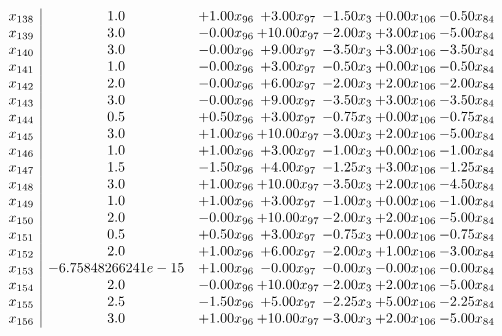\documentclass[8pt]{article}
\begin{document}
\[\begin{array}{c| c c@{\hskip 2pt} c@{\hskip 2pt} c@{\hskip 2pt} c@{\hskip 2pt} c@{\hskip 2pt} }
 x_{138}   &  1.0 & +  1.00 x_{96} & +  3.00 x_{97} & -1.50 x_{3} & +  0.00 x_{106} & -0.50 x_{84}\\
 x_{139}   &  3.0 & -0.00 x_{96} & + 10.00 x_{97} & -2.00 x_{3} & +  3.00 x_{106} & -5.00 x_{84}\\
 x_{140}   &  3.0 & -0.00 x_{96} & +  9.00 x_{97} & -3.50 x_{3} & +  3.00 x_{106} & -3.50 x_{84}\\
 x_{141}   &  1.0 & -0.00 x_{96} & +  3.00 x_{97} & -0.50 x_{3} & +  0.00 x_{106} & -0.50 x_{84}\\
 x_{142}   &  2.0 & -0.00 x_{96} & +  6.00 x_{97} & -2.00 x_{3} & +  2.00 x_{106} & -2.00 x_{84}\\
 x_{143}   &  3.0 & -0.00 x_{96} & +  9.00 x_{97} & -3.50 x_{3} & +  3.00 x_{106} & -3.50 x_{84}\\
 x_{144}   &  0.5 & +  0.50 x_{96} & +  3.00 x_{97} & -0.75 x_{3} & +  0.00 x_{106} & -0.75 x_{84}\\
 x_{145}   &  3.0 & +  1.00 x_{96} & + 10.00 x_{97} & -3.00 x_{3} & +  2.00 x_{106} & -5.00 x_{84}\\
 x_{146}   &  1.0 & +  1.00 x_{96} & +  3.00 x_{97} & -1.00 x_{3} & +  0.00 x_{106} & -1.00 x_{84}\\
 x_{147}   &  1.5 & -1.50 x_{96} & +  4.00 x_{97} & -1.25 x_{3} & +  3.00 x_{106} & -1.25 x_{84}\\
 x_{148}   &  3.0 & +  1.00 x_{96} & + 10.00 x_{97} & -3.50 x_{3} & +  2.00 x_{106} & -4.50 x_{84}\\
 x_{149}   &  1.0 & +  1.00 x_{96} & +  3.00 x_{97} & -1.00 x_{3} & +  0.00 x_{106} & -1.00 x_{84}\\
 x_{150}   &  2.0 & -0.00 x_{96} & + 10.00 x_{97} & -2.00 x_{3} & +  2.00 x_{106} & -5.00 x_{84}\\
 x_{151}   &  0.5 & +  0.50 x_{96} & +  3.00 x_{97} & -0.75 x_{3} & +  0.00 x_{106} & -0.75 x_{84}\\
 x_{152}   &  2.0 & +  1.00 x_{96} & +  6.00 x_{97} & -2.00 x_{3} & +  1.00 x_{106} & -3.00 x_{84}\\
 x_{153}   &  -6.75848266241e-15 & +  1.00 x_{96} & -0.00 x_{97} & -0.00 x_{3} & -0.00 x_{106} & -0.00 x_{84}\\
 x_{154}   &  2.0 & -0.00 x_{96} & + 10.00 x_{97} & -2.00 x_{3} & +  2.00 x_{106} & -5.00 x_{84}\\
 x_{155}   &  2.5 & -1.50 x_{96} & +  5.00 x_{97} & -2.25 x_{3} & +  5.00 x_{106} & -2.25 x_{84}\\
 x_{156}   &  3.0 & +  1.00 x_{96} & + 10.00 x_{97} & -3.00 x_{3} & +  2.00 x_{106} & -5.00 x_{84}\\

\end{array}\]
\end{document}
